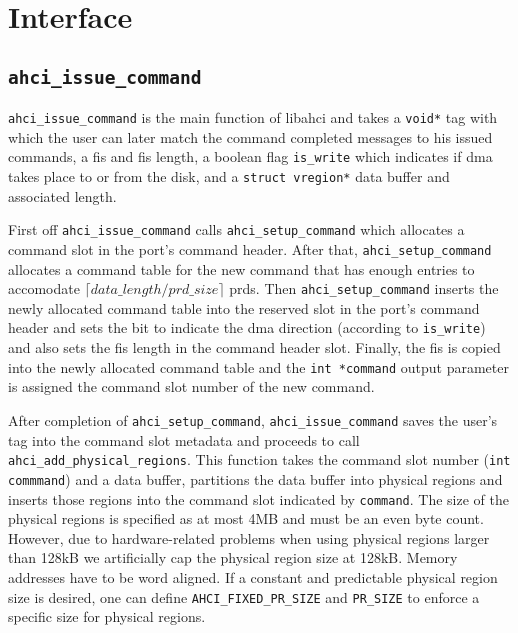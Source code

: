 \newcommand{\issuecmd}{\lstinline+ahci_issue_command+\xspace}
\section[libahci Interface]{\libahci Interface}

\subsection[ahci\_issue\_command]{\issuecmd}

\issuecmd is the main function of libahci and takes a \lstinline+void*+ tag
with which the user can later match the command completed messages to his
issued commands, a \ac{fis} and \ac{fis} length, a boolean flag
\lstinline+is_write+ which indicates if \acs{dma} takes place to or from the
disk, and a \lstinline+struct vregion*+ data buffer and associated length.

\newcommand{\setupcmd}{\lstinline+ahci_setup_command+\xspace} First off
\issuecmd calls \setupcmd which allocates a command slot in the port's command
header. After that, \setupcmd allocates a command table for the new command
that has enough entries to accomodate $\lceil
data\_length\allowbreak/\allowbreak prd\_size\rceil$ \acp{prd}. Then \setupcmd
inserts the newly allocated command table into the reserved slot in the port's
command header and sets the bit to indicate the \acs{dma} direction (according
to \lstinline+is_write+) and also sets the \ac{fis} length in the command
header slot.  Finally, the \ac{fis} is copied into the newly allocated command
table and the \lstinline+int *command+ output parameter is assigned the command
slot number of the new command.

\newcommand{\addprs}{\lstinline+ahci_add_physical_regions+\xspace} After
completion of \setupcmd, \issuecmd saves the user's tag into the command slot
metadata and proceeds to call \addprs. This function takes the command slot
number (\lstinline+int commmand+) and a data buffer, partitions the data buffer
into physical regions and inserts those regions into the command slot indicated
by \lstinline+command+. The size of the physical regions is specified as at
most 4MB and must be an even byte count. However, due to hardware-related
problems when using physical regions larger than 128kB we artificially cap the
physical region size at 128kB. Memory addresses have to be word aligned.  If a
constant and predictable physical region size is desired, one can define
\lstinline+AHCI_FIXED_PR_SIZE+ and \lstinline+PR_SIZE+ to enforce a specific
size for physical regions.

